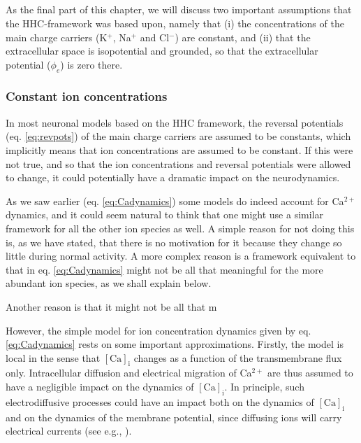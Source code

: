 \subsection{}
As the final part of this chapter, we will discuss two important assumptions that the HHC-framework was based upon, namely that (i) the concentrations of the main charge carriers (K$^{+}$, Na$^{+}$ and Cl$^{-}$) are constant, and (ii) that the extracellular space is isopotential and grounded, so that the extracellular potential ($\phi_e$) is zero there. 



\subsubsection{Constant ion concentrations}
In most neuronal models based on the HHC framework, the reversal potentials (eq. \ref{eq:revpots}) of the main charge carriers are assumed to be constants, which implicitly means that ion concentrations are assumed to be constant. If this were not true, and 
so that the ion concentrations and reversal potentials were allowed to change, it could potentially have a dramatic impact on the neurodynamics. 

As we saw earlier (eq. \ref{eq:Cadynamics}) some models do indeed account for Ca$^{2+}$ dynamics, and it could seem natural to think that one might use a similar framework for all the other ion species as well. A simple reason for not doing this is, as we have stated, that there is no motivation for it because they change so little during normal activity. A more complex reason is a framework equivalent to that in eq. \ref{eq:Cadynamics} might not be all that meaningful for the more abundant ion species, as we shall explain below. 

Another reason is that it might not be all that m


However, the simple model for ion concentration dynamics given by eq. \ref{eq:Cadynamics} rests on some important approximations.
Firstly, the model is local in the sense that $\mathrm{[Ca]_i}$ changes as a function of the transmembrane flux only. Intracellular diffusion and electrical migration of Ca$^{2+}$ are thus assumed to have a negligible impact on the dynamics of $\mathrm{[Ca]_i}$. In principle, such electrodiffusive processes could have an impact both on the dynamics of $\mathrm{[Ca]_i}$ and on the dynamics of the membrane potential, since diffusing ions will carry electrical currents (see e.g., \cite{Qian1989}). 

